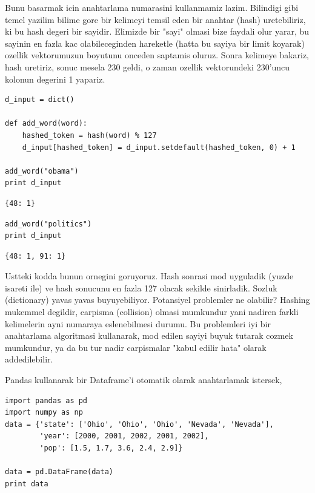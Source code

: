 \documentclass[12pt,fleqn]{article}\usepackage{../common}
\begin{document}
Bunu basarmak icin anahtarlama numarasini kullanmamiz lazim. Bilindigi
gibi temel yazilim bilime gore bir kelimeyi temsil eden bir anahtar
(hash) uretebiliriz, ki bu hash degeri bir sayidir. Elimizde bir
"sayi" olmasi bize faydali olur yarar, bu sayinin en fazla kac
olabileceginden hareketle (hatta bu sayiya bir limit koyarak) ozellik
vektorumuzun boyutunu onceden saptamis oluruz.  Sonra kelimeye
bakariz, hash uretiriz, sonuc mesela 230 geldi, o zaman ozellik
vektorundeki 230'uncu kolonun degerini 1 yapariz. 

\begin{verbatim}
d_input = dict()

def add_word(word):
    hashed_token = hash(word) % 127
    d_input[hashed_token] = d_input.setdefault(hashed_token, 0) + 1

add_word("obama")
print d_input
\end{verbatim}

\begin{verbatim}
{48: 1}
\end{verbatim}

\begin{verbatim}
add_word("politics")
print d_input
\end{verbatim}

\begin{verbatim}
{48: 1, 91: 1}
\end{verbatim}

Ustteki kodda bunun ornegini goruyoruz. Hash sonrasi mod uyguladik
(yuzde isareti ile) ve hash sonucunu en fazla 127 olacak sekilde
sinirladik. Sozluk (dictionary) yavas yavas buyuyebiliyor.
Potansiyel problemler ne olabilir? Hashing mukemmel degildir, carpisma
(collision) olmasi mumkundur yani nadiren farkli kelimelerin ayni
numaraya eslenebilmesi durumu. Bu problemleri iyi bir anahtarlama
algoritmasi kullanarak, mod edilen sayiyi buyuk tutarak cozmek
mumkundur, ya da bu tur nadir carpismalar "kabul edilir hata" olarak
addedilebilir.

Pandas kullanarak bir Dataframe'i otomatik olarak anahtarlamak istersek,

\begin{verbatim}
import pandas as pd
import numpy as np
data = {'state': ['Ohio', 'Ohio', 'Ohio', 'Nevada', 'Nevada'],
        'year': [2000, 2001, 2002, 2001, 2002],
        'pop': [1.5, 1.7, 3.6, 2.4, 2.9]}

data = pd.DataFrame(data)
print data
\end{verbatim}
\end{document}
